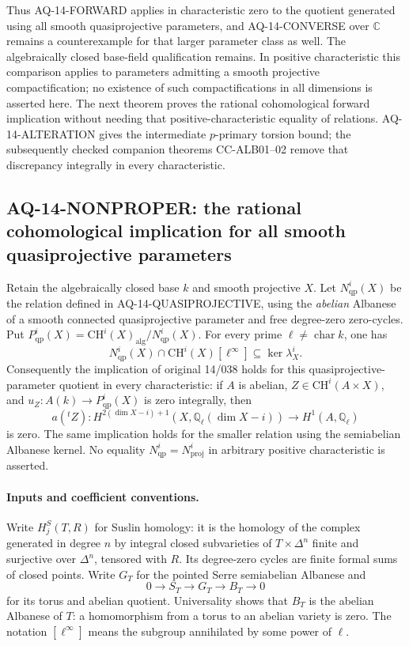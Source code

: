 \documentclass[11pt,a4paper]{article}
\theoremstyle{definition}\newtheorem{definition}[theorem]{Definition}
\theoremstyle{remark}\newtheorem{remark}[theorem]{Remark}
\begin{document}
Thus AQ-14-FORWARD applies in characteristic zero to the
quotient generated using all smooth quasiprojective
parameters, and AQ-14-CONVERSE over $\mathbb C$ remains
a counterexample for that larger parameter class as
well. The algebraically closed base-field qualification
remains. In positive characteristic this comparison
applies to parameters admitting a smooth projective
compactification; no existence of such compactifications
in all dimensions is asserted here. The next theorem proves the
rational cohomological forward implication without needing that
positive-characteristic equality of relations. AQ-14-ALTERATION gives the intermediate $p$-primary torsion bound; the subsequently checked companion theorems CC-ALB01--02 remove that discrepancy integrally in every characteristic.

\subsection{AQ-14-NONPROPER: the rational cohomological implication for all smooth quasiprojective parameters}
Retain the algebraically closed base $k$ and smooth projective $X$.
Let $N^i_{\mathrm{qp}}(X)$ be the relation defined in
AQ-14-QUASIPROJECTIVE, using the \emph{abelian} Albanese of a
smooth connected quasiprojective parameter and free degree-zero
zero-cycles. Put
$P^i_{\mathrm{qp}}(X)=\mathrm{CH}^i(X)_{\mathrm{alg}}/
N^i_{\mathrm{qp}}(X)$. For every prime
$\ell\ne\operatorname{char}k$, one has
\[
 N^i_{\mathrm{qp}}(X)\cap\mathrm{CH}^i(X)[\ell^\infty]
       \subseteq\ker\lambda_X^i.                            \tag{AQ.14.2}
\]
Consequently the implication of original 14/038 holds for this
quasiprojective-parameter quotient in every characteristic:
if $A$ is abelian, $Z\in\mathrm{CH}^i(A\times X)$, and
$u_Z:A(k)\to P^i_{\mathrm{qp}}(X)$ is zero integrally, then
\[
 a({}^tZ):H^{2(\dim X-i)+1}(X,\mathbb Q_\ell(\dim X-i))
                       \longrightarrow H^1(A,\mathbb Q_\ell)
\]
is zero. The same implication holds for the smaller relation
using the semiabelian Albanese kernel. No equality
$N^i_{\mathrm{qp}}=N^i_{\mathrm{proj}}$ in arbitrary positive
characteristic is asserted.

\paragraph{Inputs and coefficient conventions.}
Write $H_j^S(T,R)$ for Suslin homology: it is the homology of
the complex generated in degree $n$ by integral closed
subvarieties of $T\times\Delta^n$ finite and surjective over
$\Delta^n$, tensored with $R$. Its degree-zero cycles are
finite formal sums of closed points. Write $G_T$ for the
pointed Serre semiabelian Albanese and
\[
 0\longrightarrow S_T\longrightarrow G_T\longrightarrow B_T
       \longrightarrow0
\]
for its torus and abelian quotient. Universality shows that
$B_T$ is the abelian Albanese of $T$: a homomorphism from a
torus to an abelian variety is zero. The notation $[\ell^\infty]$
means the subgroup annihilated by some power of $\ell$.
\end{document}
